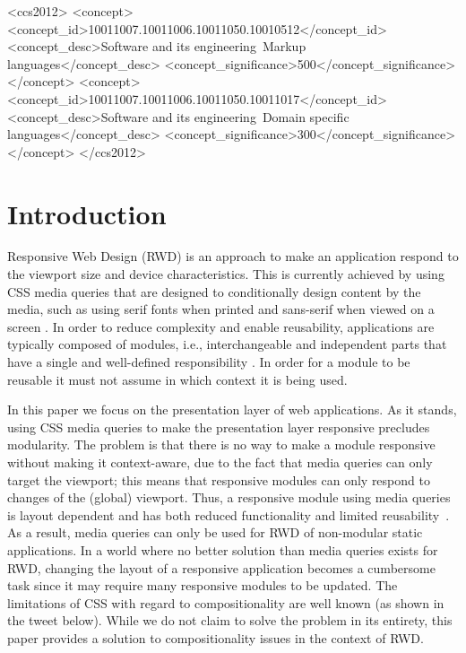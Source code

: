 \documentclass[sigconf,9pt]{acmart}
\begin{document}
\begin{CCSXML}
<ccs2012>
<concept>
<concept_id>10011007.10011006.10011050.10010512</concept_id>
<concept_desc>Software and its engineering~Markup languages</concept_desc>
<concept_significance>500</concept_significance>
</concept>
<concept>
<concept_id>10011007.10011006.10011050.10011017</concept_id>
<concept_desc>Software and its engineering~Domain specific languages</concept_desc>
<concept_significance>300</concept_significance>
</concept>
</ccs2012>
\end{CCSXML}





\maketitle

\section{Introduction}
  Responsive Web Design (RWD) is an approach to make an application respond to the viewport size and device characteristics.
  This is currently achieved by using CSS media queries that are designed to conditionally design content by the media, such as using serif fonts when printed and sans-serif when viewed on a screen \cite{w3c_css_mq}.
  In order to reduce complexity and enable reusability, applications are typically composed of modules, i.e., interchangeable and independent parts that have a single and well-defined responsibility \cite{parnas1972criteria}.
  In order for a module to be reusable it must not assume in which context it is being used.

  In this paper we focus on the presentation layer of web applications.
  As it stands, using CSS media queries to make the presentation layer responsive precludes modularity.
  The problem is that there is no way to make a module responsive without making it context-aware, due to the fact that media queries can only target the viewport; this means that responsive modules can only respond to changes of the (global) viewport.
  Thus, a responsive module using media queries is layout dependent and has both reduced functionality and limited reusability~\cite{elq-thesis}.
  As a result, media queries can only be used for RWD of non-modular static applications.
  In a world where no better solution than media queries exists for RWD, changing the layout of a responsive application becomes a cumbersome task since it may require many responsive modules to be updated.
  The limitations of CSS with regard to compositionality are well known (as shown in the tweet below). While we do not claim to solve the problem in its entirety, this paper provides a solution to compositionality issues in the context of RWD.
\end{document}
